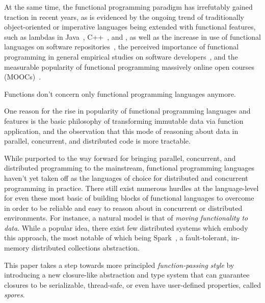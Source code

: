 \documentclass{llncs}
\begin{document}
At the same time, the functional programming paradigm has irrefutably gained
traction in recent years, as is evidenced by the ongoing trend of
traditionally object-oriented or imperative languages being extended with
functional features, such as lambdas in Java~\cite{JavaLambdas},
C++~\cite{CplusplusLambas}, and , as well as the increase in
use of functional languages on software repositories~\cite{find-something},
the perceived importance of functional programming in general empirical
studies on software developers~\cite{PLAdoption}, and the measurable popularity of functional programming massively
online open courses (MOOCs)~\cite{ICSEMOOC}.

Functions don't concern only functional programming languages anymore.

One reason for the rise in
popularity of functional programming languages and features is the basic
philosophy of transforming immutable data via function application, and the
observation that this mode of reasoning about data in parallel, concurrent,
and distributed code is more tractable.


While purported to the way forward for bringing parallel, concurrent, and
distributed programming to the mainstream, functional programming languages
haven't yet taken off as the languages of choice for distributed and
concurrent programming in practice. There still exist numerous hurdles at the
language-level for even these most basic of building blocks of functional
languages to overcome in order to be reliable and easy to reason about in
concurrent or distributed environments. For instance, a natural model is that
of {\em moving functionality to data}. While a popular idea, there exist few
distributed systems which embody this approach, the most notable of which
being Spark~\cite{Spark}, a fault-tolerant, in-memory distributed collections
abstraction.

This paper takes a step towards more principled {\em function-passing
style} by
introducing a new closure-like abstraction and type system that can guarantee
closures to be serializable, thread-safe, or even have user-defined
properties, called {\em spores}.
\end{document}
